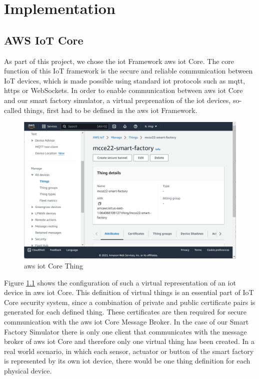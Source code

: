 \chapter{Implementation}

\section{AWS IoT Core}

As part of this project, we chose the \ac{iot} Framework \ac{aws} \ac{iot} Core. 
The core function of this IoT framework is the secure and reliable communication between IoT devices, which is made possible using standard \ac{iot} protocols such as \ac{mqtt}, \ac{https} or WebSockets. 
In order to enable communication between \ac{aws} \ac{iot} Core and our smart factory simulator, a virtual preprenation of the \ac{iot} devices, so-called things, first had to be defined in the \ac{aws} \ac{iot} Framework. 

\begin{figure}[H]
	\centering
	\includegraphics[width=15cm]{images/smart_factory_thing.png}
	\caption{\ac{aws} \ac{iot} Core Thing}    
	\label{fig:SmartFactoryThing}
\end{figure}

Figure \ref{fig:SmartFactoryThing} shows the configuration of such a virtual representation of an \ac{iot} device in \ac{aws} \ac{iot} Core. 
This definition of virtual things is an essential part of IoT Core security system, since a combination of private and public certificate pairs is generated for each defined thing.
These certificates are then required for secure communication with the \ac{aws} \ac{iot} Core Message Broker. 
In the case of our Smart Factory Simulator there is only one client that communicates with the message broker of \ac{aws} \ac{iot} Core and therefore only one virtual thing has been created. 
In a real world scenario, in which each sensor, actuator or button of the smart factory is  represented by its own \ac{iot} device, there would be one thing definition for each physical device.

